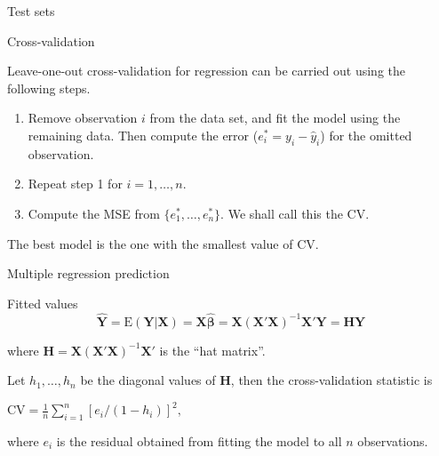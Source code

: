 \documentclass[14pt]{beamer}
\makeatletter
\def\ben{\begin{enumerate}[<+-| alert@+>]}
\def\een{\end{enumerate}}
\makeatother
\begin{document}
\begin{frame}{Test sets}


\end{frame}

\begin{frame}{Cross-validation}

Leave-one-out cross-validation for regression can be carried out using the following steps.
\ben
\item Remove observation $i$ from the data set, and fit the model using the remaining data. Then compute the error ($e_i^*=y_i-\hat{y}_i$) for the omitted observation.
\item Repeat step 1 for $i=1,\dots,n$.
\item Compute the MSE from $\{e_1^*,\dots,e_n^*\}$. We shall call this the CV.
\een\pause
The best model is the one with the smallest value of CV.
\end{frame}

\begin{frame}{Multiple regression prediction}


\begin{block}{Fitted values}\vspace*{-0.2cm}
\[
\hat{\bm{Y}} =
\text{E}(\bm{Y}|\bm{X}) =
\bm{X}\hat{\bm{\beta}} = \bm{X}(\bm{X}'\bm{X})^{-1}\bm{X}'\bm{Y} = \bm{H}\bm{Y}
\]
\end{block}
where $\bm{H} = \bm{X}(\bm{X}'\bm{X})^{-1}\bm{X}'$ is the ``hat matrix''.\pause


Let $h_1,\dots,h_n$ be the diagonal values of $\bm{H}$, then the cross-validation statistic is
\begin{block}{}
\centerline{$\displaystyle
\text{CV} = \frac1n\sum_{i=1}^n[e_i/(1-h_i)]^2,$}
\end{block}
where $e_i$ is the residual obtained from fitting the model to all $n$ observations.


\end{frame}
\end{document}

